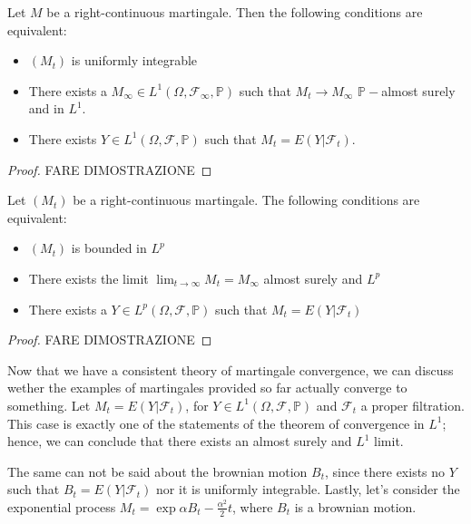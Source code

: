 \begin{theorem}[Convergence in $L^1$]
    Let $M$ be a right-continuous martingale. Then the following conditions are equivalent:
    \begin{itemize}
        \item $(M_t)$ is uniformly integrable
        \item There exists a $M_{\infty} \in L^1(\Omega,\mathcal{F}_{\infty}, \mathbb{P})$ such that $M_t \to M_{\infty}$ $\mathbb{P}-$almost surely and in $L^1$. 
        \item There exists $Y \in L^1(\Omega,\mathcal{F},\mathbb{P})$ such that $M_t = E(Y \vert \mathcal{F}_t)$. 
    \end{itemize}
\end{theorem}
\begin{proof}
    FARE DIMOSTRAZIONE
\end{proof}

\begin{theorem}[Convergence in $L^p$]
    Let $(M_t)$ be a right-continuous martingale. The following conditions are equivalent: 
    \begin{itemize}
        \item $(M_t)$ is bounded in $L^p$
        \item There exists the limit $\lim_{t \to \infty} M_t = M_{\infty}$ almost surely and $L^p$
        \item There exists a $Y \in L^p(\Omega, \mathcal{F}, \mathbb{P})$ such that $M_t = E(Y \vert \mathcal{F}_t)$
    \end{itemize}
\end{theorem}
\begin{proof}
    FARE DIMOSTRAZIONE
\end{proof}

Now that we have a consistent theory of martingale convergence, we can discuss wether the examples of martingales provided so far actually converge to something. Let $M_t = E(Y \vert \mathcal{F}_t)$, for $Y \in L^1(\Omega,\mathcal{F},\mathbb{P})$ and $\mathcal{F}_t$ a proper filtration. This case is exactly one of the statements of the theorem of convergence in $L^1$; hence, we can conclude that there exists an almost surely and $L^1$ limit. 

The same can not be said about the brownian motion $B_t$, since there exists no $Y$ such that $B_t = E(Y \vert \mathcal{F}_t)$ nor it is uniformly integrable. Lastly, let's consider the exponential process $M_t = \exp{\alpha B_t -\frac{\alpha^2}{2}t}$, where $B_t$ is a brownian motion. 

